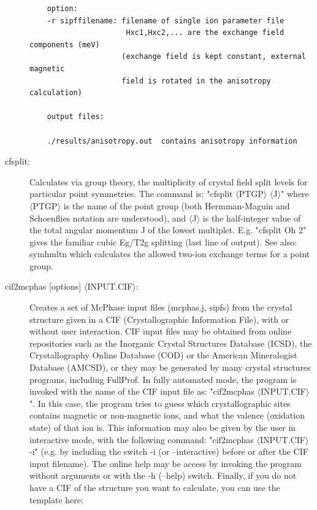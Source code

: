 \begin{description}
\begin{verbatim}
    option:
    -r sipffilename: filename of single ion parameter file
                      Hxc1,Hxc2,... are the exchange field components (meV)
                     (exchange field is kept constant, external magnetic
                     field is rotated in the anisotropy calculation)

    output files:

    ./results/anisotropy.out  contains anisotropy information

\end{verbatim}

\item [\prg cfsplit:] Calculates via group theory, the multiplicity of crystal field split levels 
for particular point symmetries. The command is: "{\prg cfsplit $\langle$PTGP$\rangle$ $\langle$J$\rangle$}"
where {\prg $\langle$PTGP$\rangle$} is the name of the point group (both Hermman-Maguin and 
Schoenflies notation are understood), and {\prg $\langle$J$\rangle$} is the half-integer value 
of the total angular momentum J of the lowest multiplet. E.g. "{\prg cfsplit Oh 2}" gives the 
familiar cubic Eg/T2g splitting (last line of output).
See also: {\prg symhmltn} which calculates the allowed two-ion exchange terms for a point group.

\item [\prg cif2mcphas {[options]} $\langle$INPUT.CIF$\rangle$:] 
Creates a set of McPhase input files (mcphas.j, sipfs) from the crystal structure given in a CIF 
(Crystallographic Information File), with or without user interaction. CIF input files may be obtained 
from online repositories such as the Inorganic Crystal Structures Database (ICSD), the Crystallography 
Online Database (COD) or the American Mineralogist Database (AMCSD), or they may be generated by many 
crystal structures programs, including FullProf. In fully automated mode, the program is invoked with 
the name of the CIF input file as: "{\prg cif2mcphas $\langle$INPUT.CIF$\rangle$}". In this case, the
program tries to guess which crystallographic sites contains magnetic or non-magnetic ions, and what the 
valence (oxidation state) of that ion is. This information may also be given by the user in interactive
mode, with the following command: "{\prg cif2mcphas $\langle$INPUT.CIF$\rangle$ -i}" (e.g. by including
the switch {\prg -i} (or {\prg --interactive}) before or after the CIF input filename). The online help
may be access by invoking the program without arguments or with the {\prg -h} ({\prg --help}) switch.
Finally, if you do not have a CIF of the structure you want to calculate, you can use the template here:


\end{description}
